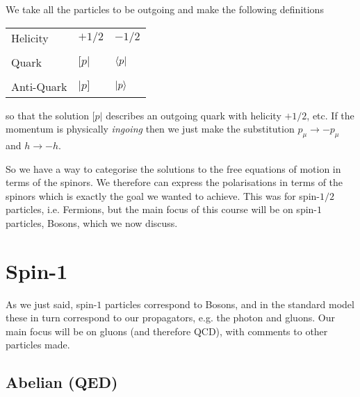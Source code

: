 We take all the particles to be outgoing and make the following definitions 

\begin{center}
	\begin{tabular}{@{} C{4cm} C{4cm} C{4cm} @{}}
		\toprule
		Helicity & $+1/2$ & $-1/2$ \\ \\
		Quark & $[p|$ & $\bra{p}$ \\ \\
		Anti-Quark & $|p]$ & $\ket{p}$ \\
		\bottomrule
	\end{tabular}
\end{center}
so that the solution $[p|$ describes an outgoing quark with helicity $+1/2$, etc. If the momentum is physically \textit{ingoing} then we just make the substitution $p_{\mu} \to -p_{\mu}$ and $h\to - h$.

So we have a way to categorise the solutions to the free equations of motion in terms of the spinors. We therefore can express the polarisations in terms of the spinors which is exactly the goal we wanted to achieve. This was for spin-$1/2$ particles, i.e. Fermions, but the main focus of this course will be on spin-$1$ particles, Bosons, which we now discuss. 

\section{Spin-1}

As we just said, spin-$1$ particles correspond to Bosons, and in the standard model these in turn correspond to our propagators, e.g. the photon and gluons. Our main focus will be on gluons (and therefore QCD), with comments to other particles made.

\subsection{Abelian (QED)}

